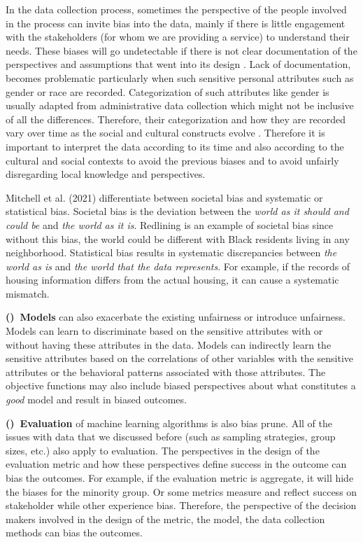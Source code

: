         In the data collection process, sometimes the perspective of the people involved in the process can invite bias into the data, mainly if there is little engagement with the stakeholders (for whom we are providing a service) to understand their needs. These biases will go undetectable if there is not clear documentation of the perspectives and assumptions that went into its design \cite{Hutchinson2021Account}. Lack of documentation, becomes problematic particularly when such sensitive personal attributes such as gender or race are recorded. Categorization of such attributes like gender is usually adapted from administrative data collection which might not be inclusive of all the differences. Therefore, their categorization and how they are recorded vary over time as the social and cultural constructs evolve \cite{Hanna2020CriticalRace}. Therefore it is important to interpret the data according to its time and also according to the cultural and social contexts to avoid the previous biases and to avoid unfairly disregarding local knowledge and perspectives.
        
        Mitchell et al. (2021) \cite{mitchell2021algorithmic} differentiate between societal bias and systematic or statistical bias. Societal bias is the deviation between the \textit{world as it should and could be} and \textit{the world as it is}. Redlining is an example of societal bias since without this bias, the world could be different with Black residents living in any neighborhood. Statistical bias results in systematic discrepancies between \textit{the world as is} and \textit{the world that the data represents}. For example, if the records of housing information differs from the actual housing, it can cause a systematic mismatch.
        
        \textbf{()~Models} can also exacerbate the existing unfairness or introduce unfairness. Models can learn to discriminate based on the sensitive attributes with or without having these attributes in the data. Models can indirectly learn the sensitive attributes based on the correlations of other variables with the sensitive attributes or the behavioral patterns associated with those attributes. The objective functions may also include biased perspectives about what constitutes a \textit{good} model and result in biased outcomes.
        
        \textbf{()~Evaluation} of machine learning algorithms is also bias prune. All of the issues with data that we discussed before (such as sampling strategies, group sizes, etc.) also apply to evaluation. The perspectives in the design of the evaluation metric and how these perspectives define success in the outcome can bias the outcomes. For example, if the evaluation metric is aggregate, it will hide the biases for the minority group. Or some metrics measure and reflect success on stakeholder while other experience bias. Therefore, the perspective of the decision makers involved in the design of the metric, the model, the data collection methods can bias the outcomes.
        
